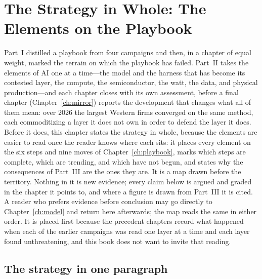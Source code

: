 \chapter{The Strategy in Whole: The Elements on the Playbook}
\label{ch:assembled}

Part~I distilled a playbook from four campaigns and then, in a chapter of equal weight, marked the terrain on which the playbook has failed. Part~II takes the elements of AI one at a time---the model and the harness that has become its contested layer, the compute, the semiconductor, the watt, the data, and physical production---and each chapter closes with its own assessment, before a final chapter (Chapter~\ref{ch:mirror}) reports the development that changes what all of them mean: over 2026 the largest Western firms converged on the same method, each commoditizing a layer it does not own in order to defend the layer it does. Before it does, this chapter states the strategy in whole, because the elements are easier to read once the reader knows where each sits: it places every element on the six steps and nine moves of Chapter~\ref{ch:playbook}, marks which steps are complete, which are trending, and which have not begun, and states why the consequences of Part~III are the ones they are. It is a map drawn before the territory. Nothing in it is new evidence; every claim below is argued and graded in the chapter it points to, and where a figure is drawn from Part~III it is cited. A reader who prefers evidence before conclusion may go directly to Chapter~\ref{ch:model} and return here afterwards; the map reads the same in either order. It is placed first because the precedent chapters record what happened when each of the earlier campaigns was read one layer at a time and each layer found unthreatening, and this book does not want to invite that reading.

\section{The strategy in one paragraph}


